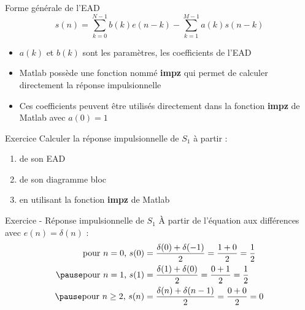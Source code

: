 \documentclass[a4paper,11pt]{beamer}
\newcounter{exampleBlockCounter}
\begin{document}
\begin{frame}

\begin{block}{Forme générale de l'EAD}
$$
s(n) = \sum_{k=0}^{N-1}b(k)e(n-k) - \sum_{k=1}^{M-1}a(k)s(n-k)
$$

\begin{itemize}\justifying
  \item $a(k)$ et $b(k)$ sont les paramètres, les coefficients de l'EAD
  \item Matlab possède une fonction nommé \textbf{impz} qui permet de calculer
  directement la réponse impulsionnelle
  \item Ces coefficients peuvent être utilisés directement dans la fonction
  \textbf{impz} de Matlab avec $a(0)=1$
\end{itemize}
\end{block}
\end{frame}

\begin{frame}
\begin{exampleblock}{Exercice }
Calculer la réponse impulsionnelle de $S_1$ à partir :
\begin{enumerate}
  \item de son EAD
  \item de son diagramme bloc
  \item en utilisant la fonction \textbf{impz} de Matlab
\end{enumerate}
\end{exampleblock}
\end{frame}

\begin{frame}
\begin{exampleblock}{Exercice  - Réponse impulsionnelle de $S_1$}
À partir de l'équation aux différences avec $e(n) = \delta(n)$ :
\[
\begin{aligned}
\text{pour }n=0\text{, }s(0)&=\frac{\delta(0) + \delta(-1)}{2}=\frac{1 +
0}{2}=\frac{1}{2}\\
\pause
\text{pour }n=1\text{, }s(1)&=\frac{\delta(1) + \delta(0)}{2}=\frac{0 +
1}{2}=\frac{1}{2}\\
\pause
\text{pour }n\geq 2\text{, }s(n)&=\frac{\delta(n) + \delta(n-1)}{2}=\frac{0 +
0}{2}=0
\end{aligned}
\]
\end{exampleblock}
\end{frame}
\end{document}
